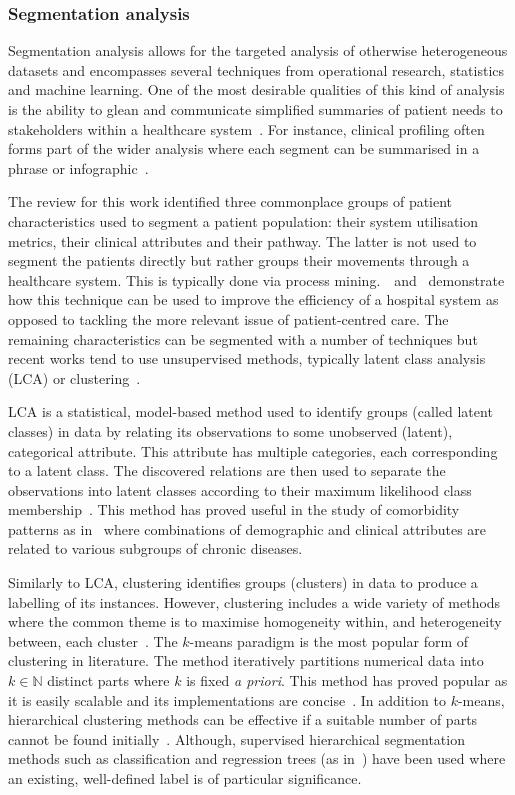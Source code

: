 \subsubsection{Segmentation analysis}

Segmentation analysis allows for the targeted analysis of otherwise
heterogeneous datasets and encompasses several techniques from operational
research, statistics and machine learning. One of the most desirable qualities
of this kind of analysis is the ability to glean and communicate simplified
summaries of patient needs to stakeholders within a healthcare
system~\cite{Vuik2016b, Yoon2020}. For instance, clinical profiling often
forms part of the wider analysis where each segment can be summarised in a
phrase or infographic~\cite{Vuik2016a, Yan2019}.

The review for this work identified three commonplace groups of patient
characteristics used to segment a patient population: their system
utilisation metrics, their clinical attributes and their pathway. The latter
is not used to segment the patients directly but rather groups their movements
through a healthcare system. This is typically done via process
mining.~\cite{Arnolds2018}~and~\cite{Delias2015} demonstrate how this technique
can be used to improve the efficiency of a hospital system as opposed to
tackling the more relevant issue of patient-centred care. The remaining
characteristics can be segmented with a number of techniques but recent works
tend to use unsupervised methods, typically latent class analysis (LCA) or
clustering~\cite{Yan2018}.

LCA is a statistical, model-based method used to identify groups (called latent
classes) in data by relating its observations to some unobserved (latent),
categorical attribute. This attribute has multiple categories, each
corresponding to a latent class. The discovered relations are then used to
separate the observations into latent classes according to their maximum
likelihood class membership~\cite{Hagenaars2002,Lazarsfeld1968}. This method has
proved useful in the study of comorbidity patterns as
in~\cite{Larsen2017,Kuwornu2014} where combinations of demographic and clinical
attributes are related to various subgroups of chronic diseases.

Similarly to LCA, clustering identifies groups (clusters) in data to produce a
labelling of its instances. However, clustering includes a wide variety of
methods where the common theme is to maximise homogeneity within, and
heterogeneity between, each cluster~\cite{Everitt2011}. The \(k\)-means paradigm
is the most popular form of clustering in literature. The method iteratively
partitions numerical data into \(k \in \mathbb{N}\) distinct parts where \(k\)
is fixed \emph{a priori}. This method has proved popular as it is easily
scalable and its implementations are concise~\cite{Olafsson2008,Wu2009}. In
addition to \(k\)-means, hierarchical clustering methods can be effective if a
suitable number of parts cannot be found initially~\cite{Vuik2016a}. Although,
supervised hierarchical segmentation methods such as classification and
regression trees (as in~\cite{Harper2006}) have been used where an existing,
well-defined label is of particular significance.

